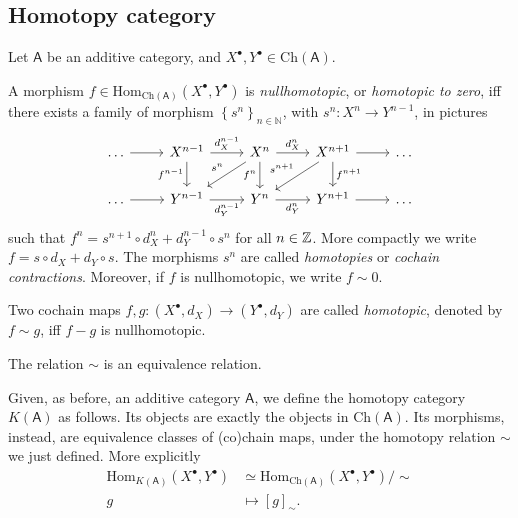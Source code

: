 \subsection{Homotopy category}
Let $\mathsf{A}$ be an additive category, and $X^{\bullet}, Y^{\bullet} \in \mathrm{Ch}(\mathsf{A})$.

\begin{defn}
	A morphism $f \in \mathrm{Hom}_{\mathrm{Ch}(\mathsf{A})} \left( X^{\bullet}, Y^{\bullet} \right)$ is
	{\em nullhomotopic}, or {\em homotopic to zero}, iff there exists
	a family of morphism $\left\{ s^n \right\}_{n \in \mathbb{N}}$, with
	$s^n\colon X^n \to Y^{n-1}$, in pictures
	\begin{equation}
	\begin{tikzcd}
		\ldots \arrow[r, "", rightarrow] &
		X^{n-1} \arrow[r, "d_X^{n-1}", rightarrow] \arrow[d, "f^{n-1}"', rightarrow] &
		X^n \arrow[r, "d^n_X", rightarrow] \arrow[d, "f^n"', rightarrow] \arrow[ld, "s^n"', rightarrow] &
		X^{n+1} \arrow[r, "", rightarrow] \arrow[d, "f^{n+1}", rightarrow] \arrow[dl, "s^{n+1}"', rightarrow] &
		\ldots \\
		\ldots \arrow[r, "", rightarrow] &
		Y^{n-1} \arrow[r, "d_Y^{n-1}"', rightarrow] &
		Y^n \arrow[r, "d^n_Y"', rightarrow] &
		Y^{n+1} \arrow[r, "", rightarrow] &
		\ldots
	\end{tikzcd}
	\end{equation}
	such that $f^n = s^{n+1} \circ d_X^{n} + d_Y^{n-1} \circ s^n$ for all $n \in \mathbb{Z}$.
	More compactly we write $f = s \circ d_X + d_Y \circ s$.
	The morphisms $s^n$ are called {\em homotopies} or {\em cochain contractions}.
	Moreover, if $f$ is nullhomotopic, we write $f \sim 0$.
\end{defn}

\begin{defn}
	Two cochain maps $f,g\colon \left( X^{\bullet}, d_{X} \right) \to \left( Y^{\bullet}, d_{Y} \right)$
	are called {\em homotopic}, denoted by $f \sim g$, iff
	$f - g$ is nullhomotopic.
\end{defn}

\begin{rem}[]
	The relation $\sim$ is an equivalence relation.
\end{rem}

\begin{defn}
	Given, as before, an additive category $\mathsf{A}$, we define the homotopy category
	$K(\mathsf{A})$ as follows.
	Its objects are exactly the objects in $\mathrm{Ch}(\mathsf{A})$.
	Its morphisms, instead, are equivalence classes of (co)chain maps,
	under the homotopy relation $\sim$ we just defined.
	More explicitly
	\begin{align}
		\mathrm{Hom}_{K(\mathsf{A})} \left( X^\bullet, Y^\bullet \right)
		&\simeq \mathrm{Hom}_{\mathrm{Ch}(\mathsf{A})}\left( X^\bullet, Y^\bullet \right)/\sim\\
		g &\mapsto \left[ g \right]_{\sim}
	.\end{align} 
\end{defn}

